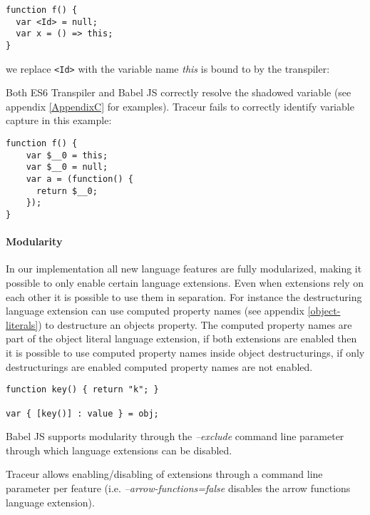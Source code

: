 \begin{lstlisting}[label=traceur-capture, caption=Example input to Traceur\protect\footnotemark]
function f() {
  var <Id> = null;
  var x = () => this;
}
\end{lstlisting}

we replace \lstinline$<Id>$ with the variable name \textit{this} is bound to by the transpiler:

Both ES6 Transpiler and Babel JS correctly resolve the shadowed variable (see appendix \ref{AppendixC} for examples). Traceur fails to correctly identify variable capture in this example:

\begin{lstlisting}[caption=Variable capture in Traceur transpiler]
function f() {
    var $__0 = this;
    var $__0 = null;
    var a = (function() {
      return $__0;
	});
}
\end{lstlisting}

\paragraph{Modularity}

In our implementation all new language features are fully modularized, making it possible to only enable certain language extensions. Even when extensions rely on each other it is possible to use them in separation. For instance the destructuring language extension can use computed property names (see appendix \ref{object-literals}) to destructure an objects property. The computed property names are part of the object literal language extension, if both extensions are enabled then it is possible to use computed property names inside object destructurings, if only destructurings are enabled computed property names are not enabled.

\begin{lstlisting}[caption=Example of computed property names inside object destructurings]
function key() { return "k"; }

var { [key()] : value } = obj;
\end{lstlisting}

Babel JS supports modularity through the \textit{--exclude} command line parameter through which language extensions can be disabled.

Traceur allows enabling/disabling of extensions through a command line parameter per feature (i.e. \textit{--arrow-functions=false} disables the arrow functions language extension).


